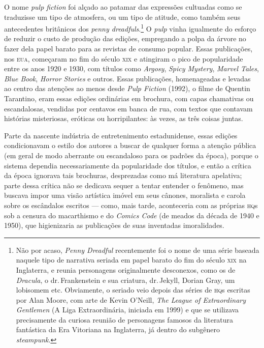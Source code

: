 O nome \emph{pulp fiction} foi alçado ao patamar das expressões
cultuadas como se traduzisse um tipo de atmosfera, ou um tipo de
atitude, como também seus antecedentes britânicos dos \emph{penny
dreadfuls}.\footnote{Não por acaso, \emph{Penny Dreadful} recentemente
  foi o nome de uma série baseada naquele tipo de narrativa seriada em
  papel barato do fim do século \textsc{xix} na Inglaterra, e reunia personagens
  originalmente desconexos, como os de \emph{Dracula}, o 
  dr.\,Frankenstein e sua criatura, dr.\,Jekyll, Dorian Gray, um lobisomem
  etc. Obviamente, o seriado veio depois das séries de \textsc{hq}s escritas por
  Alan Moore, com arte de Kevin O'Neill, \emph{The League of
  Extraordinary Gentlemen} (A Liga Extraordinária, iniciada em 1999) e
  que se utilizava precisamente da curiosa reunião de personagens
  famosos da literatura fantástica da Era Vitoriana na Inglaterra, já
  dentro do subgênero \emph{steampunk}.} O \emph{pulp} vinha igualmente
do esforço de reduzir o custo de produção das edições, empregando a
polpa da árvore no fazer dela papel barato para as revistas de consumo
popular. Essas publicações, nos \textsc{eua}, começaram no fim do século \textsc{xix}
e atingiram o pico de popularidade entre os anos 1920 e 1930, com
títulos como \emph{Argosy}, \emph{Spicy Mystery}, \emph{Marvel Tales},
\emph{Blue Book}, \emph{Horror Stories} e outros. Essas publicações,
homenageadas e levadas ao centro das atenções ao menos desde \emph{Pulp
Fiction} (1992), o filme de Quentin Tarantino, eram essas edições
ordinárias em brochura, com capas chamativas ou escandalosas, vendidas
por centavos em banca de rua, com textos que contavam histórias
misteriosas, eróticas ou horripilantes: às vezes, as três coisas juntas.

Parte da nascente indústria de entretenimento estadunidense,
essas edições condicionavam o estilo dos autores a buscar de qualquer forma a atenção
pública (em geral de modo aberrante ou escandaloso para os padrões da
época), porque o sistema dependia necessariamente da popularidade dos
títulos, e então a crítica da época ignorava tais brochuras,
desprezadas como má literatura apelativa; parte dessa crítica não se
dedicava sequer a tentar entender o fenômeno, mas buscava impor uma
visão artística imóvel em seus cânones, moralista e carola sobre os
escândalos escritos --- como, mais tarde, aconteceria com as próprias
\textsc{hq}s sob a censura do macarthismo e do \emph{Comics Code} (de meados da
década de 1940 e 1950), que higienizaria as publicações de suas
inventadas imoralidades.

